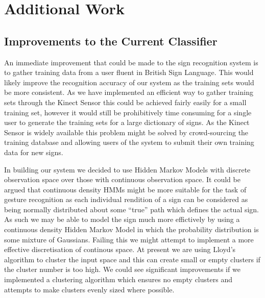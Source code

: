 \chapter{Additional Work}
\ifpdf
    \graphicspath{{Chapter3/Chapter3Figs/PNG/}{Chapter3/Chapter3Figs/PDF/}{Chapter3/Chapter3Figs/}}
\else
    \graphicspath{{Chapter3/Chapter3Figs/EPS/}{Chapter3/Chapter3Figs/}}
\fi

\section{Improvements to the Current Classifier}
An immediate improvement that could be made to the sign recognition system is to gather training data from a user fluent in British Sign Language. This would likely improve the recognition accuracy of our system as the training sets would be more consistent. As we have implemented an efficient way to gather training sets through the Kinect Sensor this could be achieved fairly easily for a small training set, however it would still be prohibitively time consuming for a single user to generate the training sets for a large dictionary of signs. As the Kinect Sensor is widely available this problem might be solved by crowd-sourcing the training database and allowing users of the system to submit their own training data for new signs.

In building our system we decided to use Hidden Markov Models with discrete observation space over those with continuous observation space. It could be argued that continuous density HMMs might be more suitable for the task of gesture recognition as each individual rendition of a sign can be considered as being normally distributed about some ``true'' path which defines the actual sign. As such we may be able to model the sign much more effictively by using a continuous density Hidden Markov Model in which the probability distribution is some mixture of Gaussians. Failing this we might attempt to implement a more effective discretisation of continous space. At present we are using Lloyd's algorithm to cluster the input space and this can create small or empty clusters if the cluster number is too high. We could see significant improvements if we implemented a clustering algorithm which ensures no empty clusters and attempts to make clusters evenly sized where possible.

